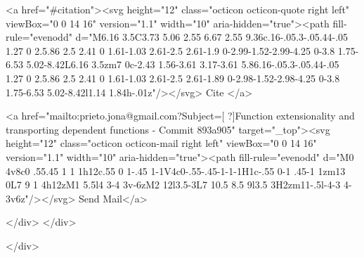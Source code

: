       <a  href="#citation"><svg height="12" class="octicon octicon-quote right left" viewBox="0 0 14 16" version="1.1" width="10" aria-hidden="true"><path fill-rule="evenodd" d="M6.16 3.5C3.73 5.06 2.55 6.67 2.55 9.36c.16-.05.3-.05.44-.05 1.27 0 2.5.86 2.5 2.41 0 1.61-1.03 2.61-2.5 2.61-1.9 0-2.99-1.52-2.99-4.25 0-3.8 1.75-6.53 5.02-8.42L6.16 3.5zm7 0c-2.43 1.56-3.61 3.17-3.61 5.86.16-.05.3-.05.44-.05 1.27 0 2.5.86 2.5 2.41 0 1.61-1.03 2.61-2.5 2.61-1.89 0-2.98-1.52-2.98-4.25 0-3.8 1.75-6.53 5.02-8.42l1.14 1.84h-.01z"/></svg> Cite
      </a>

      <a href="mailto:prieto.jona@gmail.com?Subject=[ ?]Function extensionality and transporting dependent functions  - Commit 893a905" target="_top"><svg height="12" class="octicon octicon-mail right left" viewBox="0 0 14 16" version="1.1" width="10" aria-hidden="true"><path fill-rule="evenodd" d="M0 4v8c0 .55.45 1 1 1h12c.55 0 1-.45 1-1V4c0-.55-.45-1-1-1H1c-.55 0-1 .45-1 1zm13 0L7 9 1 4h12zM1 5.5l4 3-4 3v-6zM2 12l3.5-3L7 10.5 8.5 9l3.5 3H2zm11-.5l-4-3 4-3v6z"/></svg> Send Mail</a>

    </div>
  </div>

</div>




